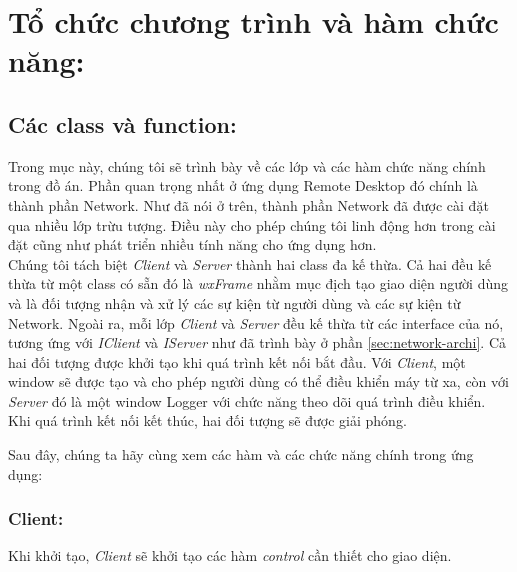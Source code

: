 \section{Tổ chức chương trình và hàm chức năng: }

\subsection{Các class và function: }
Trong mục này, chúng tôi sẽ trình bày về các lớp và các hàm chức năng chính trong đồ án. Phần quan trọng nhất ở ứng dụng Remote Desktop đó chính là thành phần Network. Như đã nói ở trên, thành phần Network đã được cài đặt qua nhiều lớp trừu tượng. Điều này cho phép chúng tôi linh động hơn trong cài đặt cũng như phát triển nhiều tính năng cho ứng dụng hơn. \\

Chúng tôi tách biệt \textit{Client} và \textit{Server} thành hai class đa kế thừa. Cả hai đều kế thừa từ một class có sẵn đó là \textit{wxFrame} nhằm mục địch tạo giao diện người dùng và là đối tượng nhận và xử lý các sự kiện từ người dùng và các sự kiện từ Network. Ngoài ra, mỗi lớp \textit{Client} và \textit{Server} đều kế thừa từ các interface của nó, tương ứng với \textit{IClient} và \textit{IServer} như đã trình bày ở phần \ref{sec:network-archi}. Cả hai đối tượng được khởi tạo khi quá trình kết nối bắt đầu. Với \textit{Client}, một window sẽ được tạo và cho phép người dùng có thể điều khiển máy từ xa, còn với \textit{Server} đó là một window Logger với chức năng theo dõi quá trình điều khiển. Khi quá trình kết nối kết thúc, hai đối tượng sẽ được giải phóng.

Sau đây, chúng ta hãy cùng xem các hàm và các chức năng chính trong ứng dụng:
\subsubsection{Client: }
Khi khởi tạo, \textit{Client} sẽ khởi tạo các hàm \textit{control} cần thiết cho giao diện.

